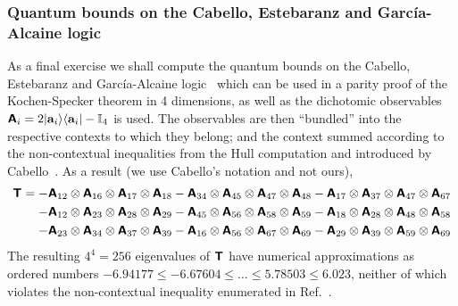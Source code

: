 \subsubsection{Quantum bounds on the Cabello, Estebaranz and Garc{\'{i}}a-Alcaine logic}

As a final exercise we shall compute the quantum bounds on the Cabello, Estebaranz and Garc{\'{i}}a-Alcaine logic~\cite{cabello-96,cabello-99}
which can be used in a parity proof of the Kochen-Specker theorem in 4 dimensions,
as well as  the dichotomic observables~\cite[Eq.~(2)]{cabello:210401}
$\textsf{\textbf{A}}_i = 2 \vert {\bf a}_i \rangle \langle {\bf a}_i \vert - \mathbb{I}_4$ is used.
The observables are then ``bundled'' into the respective contexts to which they belong; and the context summed
according to the non-contextual inequalities from the Hull computation and
introduced by Cabello~\cite[Eq.~(1)]{cabello:210401}.
As a result (we use Cabello's notation and not ours),
\begin{equation}
\begin{split}
\textsf{\textbf{T}}=
   -   \textsf{\textbf{A}}_{12} \otimes  \textsf{\textbf{A}}_{16} \otimes  \textsf{\textbf{A}}_{17} \otimes   \textsf{\textbf{A}}_{18}
   -   \textsf{\textbf{A}}_{34} \otimes  \textsf{\textbf{A}}_{45} \otimes  \textsf{\textbf{A}}_{47} \otimes   \textsf{\textbf{A}}_{48}
   -   \textsf{\textbf{A}}_{17} \otimes  \textsf{\textbf{A}}_{37} \otimes  \textsf{\textbf{A}}_{47} \otimes   \textsf{\textbf{A}}_{67}
 \\
   -   \textsf{\textbf{A}}_{12} \otimes  \textsf{\textbf{A}}_{23} \otimes  \textsf{\textbf{A}}_{28} \otimes   \textsf{\textbf{A}}_{29}
   -   \textsf{\textbf{A}}_{45} \otimes  \textsf{\textbf{A}}_{56} \otimes  \textsf{\textbf{A}}_{58} \otimes   \textsf{\textbf{A}}_{59}
   -   \textsf{\textbf{A}}_{18} \otimes  \textsf{\textbf{A}}_{28} \otimes  \textsf{\textbf{A}}_{48} \otimes   \textsf{\textbf{A}}_{58}
 \\
   -   \textsf{\textbf{A}}_{23} \otimes  \textsf{\textbf{A}}_{34} \otimes  \textsf{\textbf{A}}_{37} \otimes   \textsf{\textbf{A}}_{39}
   -   \textsf{\textbf{A}}_{16} \otimes  \textsf{\textbf{A}}_{56} \otimes  \textsf{\textbf{A}}_{67} \otimes   \textsf{\textbf{A}}_{69}
   -   \textsf{\textbf{A}}_{29} \otimes  \textsf{\textbf{A}}_{39} \otimes  \textsf{\textbf{A}}_{59} \otimes   \textsf{\textbf{A}}_{69}
\end{split}
\label{e-2017-b-whatever-e7cabnc}
\end{equation}
The resulting $4^4=256$ eigenvalues of $\textsf{\textbf{T}}$
have numerical approximations as ordered numbers
$ -6.94177 \le  -6.67604\le   \ldots \le  5.78503\le  6.023$,
neither of which violates the non-contextual inequality enumerated in Ref.~\cite[Eq.~(1)]{cabello:210401}.


